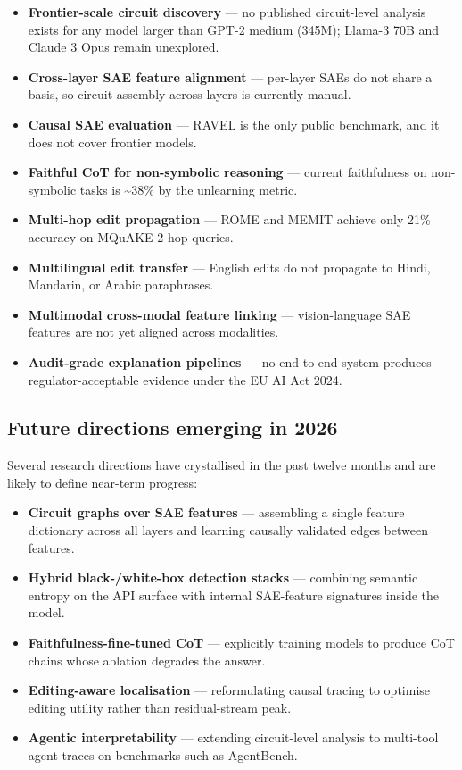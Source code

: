 \documentclass{article}
\begin{document}
\begin{itemize}

\item
  \textbf{Frontier-scale circuit discovery} --- no published circuit-level analysis exists for any model larger than GPT-2 medium (345M); Llama-3 70B and Claude 3 Opus remain unexplored.
\item
  \textbf{Cross-layer SAE feature alignment} --- per-layer SAEs do not share a basis, so circuit assembly across layers is currently manual.
\item
  \textbf{Causal SAE evaluation} --- RAVEL is the only public benchmark, and it does not cover frontier models.
\item
  \textbf{Faithful CoT for non-symbolic reasoning} --- current faithfulness on non-symbolic tasks is \textasciitilde38\% by the unlearning metric.
\item
  \textbf{Multi-hop edit propagation} --- ROME and MEMIT achieve only 21\% accuracy on MQuAKE 2-hop queries.
\item
  \textbf{Multilingual edit transfer} --- English edits do not propagate to Hindi, Mandarin, or Arabic paraphrases.
\item
  \textbf{Multimodal cross-modal feature linking} --- vision-language SAE features are not yet aligned across modalities.
\item
  \textbf{Audit-grade explanation pipelines} --- no end-to-end system produces regulator-acceptable evidence under the EU AI Act 2024.
\end{itemize}

\subsection{Future directions emerging in 2026}\label{future-directions-emerging-in-2026}

Several research directions have crystallised in the past twelve months and are likely to define near-term progress:

\begin{itemize}

\item
  \textbf{Circuit graphs over SAE features} --- assembling a single feature dictionary across all layers and learning causally validated edges between features.
\item
  \textbf{Hybrid black-/white-box detection stacks} --- combining semantic entropy on the API surface with internal SAE-feature signatures inside the model.
\item
  \textbf{Faithfulness-fine-tuned CoT} --- explicitly training models to produce CoT chains whose ablation degrades the answer.
\item
  \textbf{Editing-aware localisation} --- reformulating causal tracing to optimise editing utility rather than residual-stream peak.
\item
  \textbf{Agentic interpretability} --- extending circuit-level analysis to multi-tool agent traces on benchmarks such as AgentBench.
\end{itemize}
\end{document}
